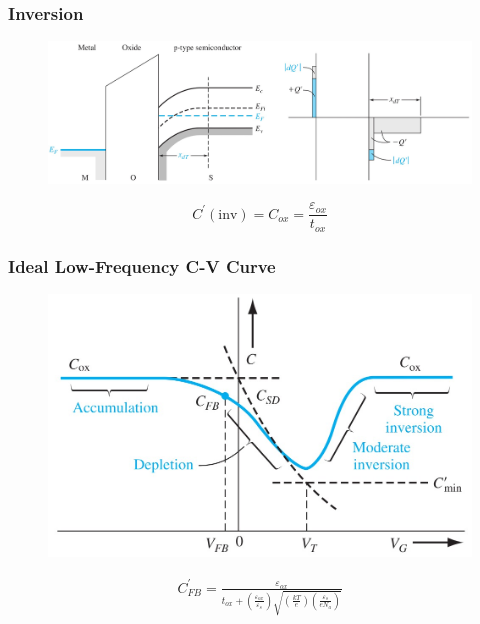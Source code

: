 \documentclass{beamer}
\begin{document}
    \begin{frame} \frametitle{Inversion}
        \begin{figure}[H]
            \centering
            \includegraphics[width=0.9\linewidth]{C-V-inversion.jpg}
            \label{fig:C-V-inversion.jpg}
        \end{figure}
        \begin{equation*}
            C^\prime (\text{inv}) = C_{ox} = \frac{\varepsilon_{ox} }{t_{ox}}
        \end{equation*}
    \end{frame}

    \begin{frame} \frametitle{Ideal Low-Frequency C-V Curve}
        \begin{figure}[H]
            \centering
            \includegraphics[width=0.8\linewidth]{C-V-graph-low-frequency.jpg}
            \label{fig:C-V-graph-low-frequency.jpg}
        \end{figure}
        \begin{equation*}
            \begin{aligned}
                C^\prime_{FB} = \frac{\varepsilon_{ox} }{t_{ox} + \left( \frac{\varepsilon_{ox} }{\varepsilon_s}  \right) \sqrt{\left( \frac{kT}{e}  \right) \left( \frac{\varepsilon_s}{eN_a}  \right)}} 
            \end{aligned}
        \end{equation*}
    \end{frame}
\end{document}
